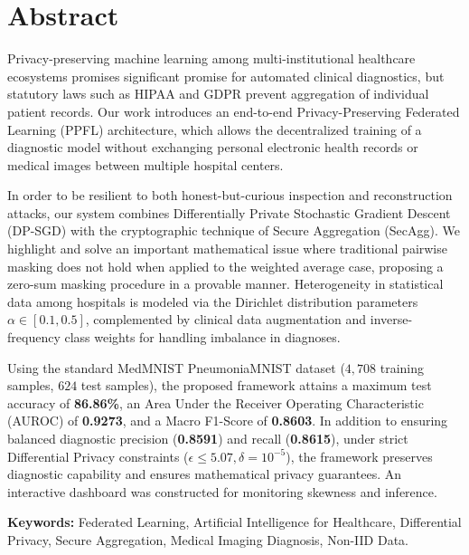 \documentclass[12pt,a4paper]{report}
\begin{document}
\newpage
\chapter*{Abstract}

Privacy-preserving machine learning among multi-institutional healthcare ecosystems promises significant promise for automated clinical diagnostics, but statutory laws such as HIPAA and GDPR prevent aggregation of individual patient records. Our work introduces an end-to-end Privacy-Preserving Federated Learning (PPFL) architecture, which allows the decentralized training of a diagnostic model without exchanging personal electronic health records or medical images between multiple hospital centers.

In order to be resilient to both honest-but-curious inspection and reconstruction attacks, our system combines Differentially Private Stochastic Gradient Descent (DP-SGD) with the cryptographic technique of Secure Aggregation (SecAgg). We highlight and solve an important mathematical issue where traditional pairwise masking does not hold when applied to the weighted average case, proposing a zero-sum masking procedure in a provable manner. Heterogeneity in statistical data among hospitals is modeled via the Dirichlet distribution parameters $\alpha \in [0.1, 0.5]$, complemented by clinical data augmentation and inverse-frequency class weights for handling imbalance in diagnoses. 

Using the standard MedMNIST PneumoniaMNIST dataset ($4{,}708$ training samples, $624$ test samples), the proposed framework attains a maximum test accuracy of \textbf{86.86\%}, an Area Under the Receiver Operating Characteristic (AUROC) of \textbf{0.9273}, and a Macro F1-Score of \textbf{0.8603}. In addition to ensuring balanced diagnostic precision (\textbf{0.8591}) and recall (\textbf{0.8615}), under strict Differential Privacy constraints ($\epsilon \le 5.07, \delta = 10^{-5}$), the framework preserves diagnostic capability and ensures mathematical privacy guarantees. An interactive dashboard was constructed for monitoring skewness and inference.

\vspace{0.8cm}
\noindent \textbf{Keywords:} Federated Learning, Artificial Intelligence for Healthcare, Differential Privacy, Secure Aggregation, Medical Imaging Diagnosis, Non-IID Data.
\end{document}
